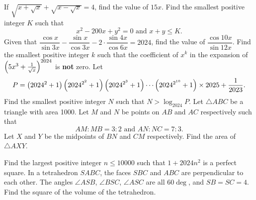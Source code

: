 \begin{enumerate}
    \setcounter{enumi}{5}
    \hyperrefitem[Q::2024-S-1-6] If $\sqrt{x + \sqrt{x}} + \sqrt{x - \sqrt{x}} = 4$, find the value of $15x$.
    \hyperrefitem[Q::2024-S-1-7] Find the smallest positive integer $K$ such that \[x^2 - 200x + y^2 = 0 \text{ and } x + y \leq K.\]
    \hyperrefitem[Q::2024-S-1-8] Given that $\dfrac{\cos{x}}{\sin{3x}} - \dfrac{\sin{x}}{\cos{3x}} - 2 \cdot \dfrac{\sin{4x}}{\cos{6x}} = 2024$, find the value of $\dfrac{\cos{10x}}{\sin{12x}}$.
    \hyperrefitem[Q::2024-S-1-9] Find the smallest positive integer $k$ such that the coefficient of $x^k$ in the expansion of $\left( 5x^3 + \frac1{\sqrt{x}} \right)^{2024}$ is \textbf{not} zero.
    \hyperrefitem[Q::2024-S-1-10] Let \[P = \left( 2024^2 + 1 \right)\left( 2024^{2^2} + 1 \right)\left( 2024^{2^3} + 1 \right)\cdots\left( 2024^{2^{10}} + 1 \right) \times 2025 + \dfrac1{2023}.\] Find the smallest positive integer $N$ such that $N > \log_{2024} P$.
    \hyperrefitem[Q::2024-S-1-11] Let $\triangle ABC$ be a triangle with area 1000. Let $M$ and $N$ be points on $AB$ and $AC$ respectively such that \[AM : MB = 3 : 2 \text{ and } AN : NC = 7 : 3.\] Let $X$ and $Y$ be the midpoints of $BN$ and $CM$ respectively. Find the area of $\triangle AXY$.

    \begin{center}
    \end{center}
    \hyperrefitem[Q::2024-S-1-12] Find the largest positive integer $n \leq 10000$ such that $1 + 2024n^2$ is a perfect square.
    \hyperrefitem[Q::2024-S-1-13] In a tetrahedron $SABC$, the faces $SBC$ and $ABC$ are perpendicular to each other. The angles $\angle ASB$, $\angle BSC$, $\angle ASC$ are all $60\deg$, and $SB = SC = 4$. Find the square of the volume of the tetrahedron.


\end{enumerate}
